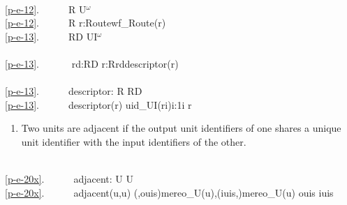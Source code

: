 \bp
\>\ \\
\ref{p-e-12}.\ \ \ \ \ \ R{\PRIM} {\EQ} U$^{\omega}$ \\
\ref{p-e-12}.\ \ \ \ \ \ R {\EQ} {\LBRACE}{\BAR} r:Route{\PRIM}{\RDOT}wf\_Route(r) {\BAR}{\RBRACE} \\
\ref{p-e-13}.\ \ \ \ \ \ RD {\EQ} UI$^{\omega}$ \\
\>\ \\
\ref{p-e-13}.\ \ \ \ \ \ {\ALL} rd:RD {\RDOT} {\EXISTS} r:R{\RDOT}rd{\EQ}descriptor(r) \\
\>\ \\
\ref{p-e-13}.\ \ \ \ \ \ descriptor: R {\RIGHTARROW} RD \\
\ref{p-e-13}.\ \ \ \ \ \ descriptor(r) {\IS} {\LANGLE}uid\_UI(r{\LBRACKET}i{\RBRACKET}){\BAR}i:1{\LEQ}i{\LEQ} r{\RANGLE}\ \ \ 
\ep

\mnewfoil\LLLL\HHHH

\begin{enumerate}\setei
\item \label{p-e-20x}   Two units are adjacent if the output unit
  identifiers of one shares a unique unit identifier with the input
  identifiers of the other.
\savei\end{enumerate}

\bp
\>\  \\
\ref{p-e-20x}.\ \ \ \ \ \ adjacent: U {\TIMES} U {\RIGHTARROW}  \\
\ref{p-e-20x}.\ \ \ \ \ \ adjacent(u,u{\PRIM}) {\IS} \kw{let} (,ouis){\EQ}mereo\_U(u),(iuis,){\EQ}mereo\_U(u{\PRIM})  ouis {\INTER} iuis {\NOTEQ} {\LBRACE}{\RBRACE} 
\ep


